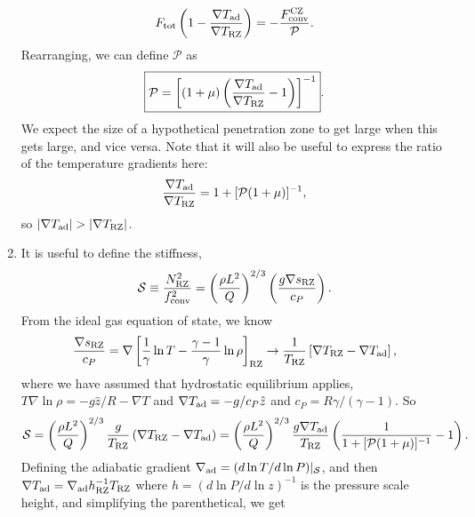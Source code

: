 \documentclass[onecolumn, amsmath, amsfonts, amssymb]{aastex62}
\newcommand{\grad}{\ensuremath{\nabla}}
\newcommand{\mP}{\ensuremath{\mathcal{P}}}
\newcommand{\mS}{\ensuremath{\mathcal{S}}}
\newcommand{\FconvCZ}{\ensuremath{F_{\rm{conv}}^{\rm{CZ}}}}
\begin{document}
\begin{enumerate}
        \begin{equation}
            F_{\rm{tot}}\left(1 - \frac{\grad T_{\rm{ad}}}{\grad T_{\rm{RZ}}}\right)
            = - \frac{\FconvCZ}{\mathcal{P}}.
        \end{equation}
        Rearranging, we can define $\mP$ as
        \begin{equation}
            \boxed{
                \mathcal{P} = \left[(1 + \mu) \left(\frac{\grad T_{\rm{ad}}}{\grad T_{\rm{RZ}}} - 1\right)\right]^{-1}}.
        \end{equation}
        We expect the size of a hypothetical penetration zone to get large when this gets large, and vice versa.
        Note that it will also be useful to express the ratio of the temperature gradients here:
        \begin{equation}
            \frac{\grad T_{\rm{ad}}}{\grad T_{\rm{RZ}}} = 1 + [\mathcal{P}(1 + \mu)]^{-1},
        \end{equation}
        so $|\grad T_{\rm{ad}}| > |\grad T_{\rm{RZ}}|$.
    \item It is useful to define the stiffness,
        \begin{equation}
            \mathcal{S} \equiv \frac{N_{\rm{RZ}}^2}{f_{\rm{conv}}^2}
            = \left(\frac{\rho L^2}{Q}\right)^{2/3}\left(\frac{g \grad s_{\rm{RZ}}}{c_P}\right).
        \end{equation}
        From the ideal gas equation of state, we know
        \begin{equation}
            \frac{\grad s_{\rm{RZ}}}{c_P} = \grad\left[\frac{1}{\gamma}\ln T - \frac{\gamma-1}{\gamma}\ln\rho\right]_{\rm{RZ}}
            \rightarrow
            \frac{1}{T_{\rm{RZ}}}\left[\grad T_{\rm{RZ}} - \grad T_{\rm{ad}}\right],
        \end{equation}
        where we have assumed that hydrostatic equilibrium applies, $T\grad \ln \rho = -g\hat{z} / R - \grad T$ and $\grad T_{\rm{ad}} = -g/c_P\hat{z}$ and $c_P = R \gamma/(\gamma-1)$.
        So
        \begin{equation}
            \mS = \left(\frac{\rho L^2}{Q}\right)^{2/3}\frac{g }{T_{\rm{RZ}}}\left(\grad T_{\rm{RZ}} - \grad T_{\rm{ad}}\right)
                = \left(\frac{\rho L^2}{Q}\right)^{2/3}\frac{g \grad T_{\rm{ad}}}{T_{\rm{RZ}}}\left(\frac{1}{1 + [\mathcal{P}(1 + \mu)]^{-1}} - 1\right).
        \end{equation}
        Defining the adiabatic gradient $\grad_{\rm{ad}} = (d\ln T / d\ln P)|_{\mathcal{S}}$, and then $\grad T_{\rm{ad}} = \grad_{\rm{ad}} h_{\rm{RZ}}^{-1} T_{\rm{RZ}}$ where $h = (d\ln P/d\ln z)^{-1}$ is the pressure scale height, and simplifying the parenthetical, we get

\end{enumerate}
\end{document}
